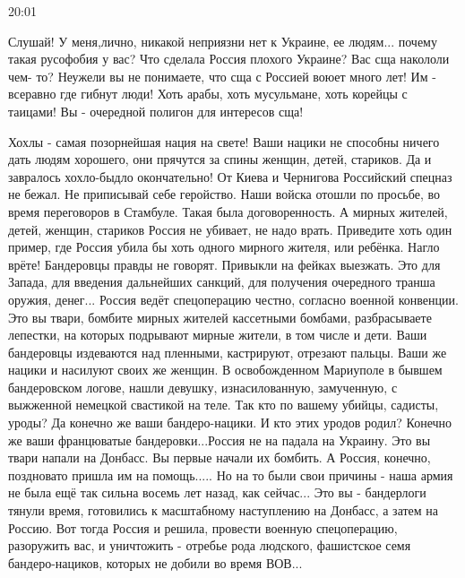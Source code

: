 20:01

Слушай! У меня,лично, никакой неприязни нет к Украине, ее людям... почему такая
русофобия у вас? Что сделала Россия плохого Украине? Вас сща накололи чем- то?
Неужели вы не понимаете, что сща с Россией воюет много лет! Им - всеравно где
гибнут люди! Хоть арабы, хоть мусульмане, хоть корейцы с таицами! Вы -
очередной полигон для интересов сща!


Хохлы - самая позорнейшая нация на свете! Ваши нацики не способны ничего дать
людям хорошего, они прячутся за спины женщин, детей, стариков. Да и завралось
хохло-быдло окончательно! От Киева и Чернигова Российский спецназ не бежал. Не
приписывай себе геройство. Наши войска отошли по просьбе, во время переговоров
в Стамбуле. Такая была договоренность. А мирных жителей, детей, женщин,
стариков Россия не убивает, не надо врать. Приведите хоть один пример, где
Россия убила бы хоть одного мирного жителя, или ребёнка. Нагло врёте!
Бандеровцы правды не говорят. Привыкли на фейках выезжать. Это для Запада, для
введения дальнейших санкций, для получения очередного транша оружия, денег...
Россия ведёт спецоперацию честно, согласно военной конвенции. Это вы твари,
бомбите мирных жителей кассетными бомбами, разбрасываете лепестки, на которых
подрывают мирные жители, в том числе и дети. Ваши бандеровцы издеваются над
пленными, кастрируют, отрезают пальцы. Ваши же нацики и насилуют своих же
женщин. В освобожденном Мариуполе в бывшем бандеровском логове, нашли девушку,
изнасилованную, замученную, с выжженной немецкой свастикой на теле. Так кто по
вашему убийцы, садисты, уроды? Да конечно же ваши бандеро-нацики. И кто этих
уродов родил? Конечно же ваши францюватые бандеровки...Россия не на падала на
Украину. Это вы твари напали на Донбасс. Вы первые начали их бомбить. А Россия,
конечно, поздновато пришла им на помощь..... Но на то были свои причины - наша
армия не была ещё так сильна восемь лет назад, как сейчас... Это вы -
бандерлоги тянули время, готовились к масштабному наступлению на Донбасс, а
затем на Россию. Вот тогда Россия и решила, провести военную спецоперацию,
разоружить вас, и уничтожить - отребье рода людского, фашистское семя
бандеро-нациков, которых не добили во время ВОВ...


